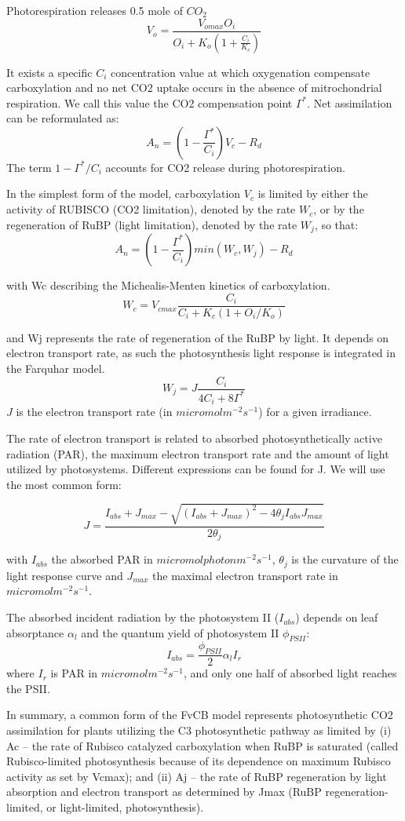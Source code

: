 \documentclass[
  12pt,
  oneside]{book}
\begin{document}
Photorespiration releases 0.5 mole of \(CO_2\)
\[
V_o=\frac{V_{omax}O_i}{O_i+K_o\left( 1+\frac{C_i}{K_c}\right)}
\]

It exists a specific \(C_i\) concentration value at which oxygenation compensate carboxylation and no net CO2 uptake occurs in the absence of mitrochondrial respiration. We call this value the CO2 compensation point \(\Gamma^*\). Net assimilation can be reformulated as:
\[
A_n=(1-\frac{\Gamma^*}{C_i})V_c-R_d
\]
The term \(1-\Gamma^*/C_i\) accounts for CO2 release during photorespiration.

In the simplest form of the model, carboxylation \(V_c\) is limited by either the activity of RUBISCO (CO2 limitation), denoted by the rate \(W_c\), or by the regeneration of RuBP (light limitation), denoted by the rate \(W_j\), so that:
\[
A_n=(1-\frac{\Gamma^*}{C_i})min(W_c,W_j)-R_d
\]

with Wc describing the Michealis-Menten kinetics of carboxylation.
\[
W_c=V_{cmax}\frac{C_i}{C_i+K_c(1+O_i/K_o)}
\]

and Wj represents the rate of regeneration of the RuBP by light. It depends on electron transport rate, as such the photosynthesis light response is integrated in the Farquhar model.\\
\[
W_j=J\frac{C_i}{4C_i+8\Gamma^*}
\]
\(J\) is the electron transport rate (in \(micromol m^{-2} s^{-1}\)) for a given irradiance.

The rate of electron transport is related to absorbed photosynthetically active radiation (PAR), the maximum electron transport rate and the amount of light utilized by photosystems. Different expressions can be found for J. We will use the most common form:

\[
J=\frac{I_{abs}+J_{max}-\sqrt{(I_{abs}+J_{max})^2-4\theta_jI_{abs}J_{max}}}{2\theta_j}
\]

with \(I_{abs}\) the absorbed PAR in \(micromol photon m^{-2} s^{-1}\), \(\theta_j\) is the curvature of the light response curve and \(J_{max}\) the maximal electron transport rate in \(micromol m^{-2} s^{-1}\).

The absorbed incident radiation by the photosystem II (\(I_{abs}\)) depends on leaf absorptance \(\alpha_l\) and the quantum yield of photosystem II \(\phi_{PSII}\):
\[
I_{abs}=\frac{\phi_{PSII}}{2}\alpha_lI_r
\]
where \(I_r\) is PAR in \(micromol m^{-2} s^{-1}\), and only one half of absorbed light reaches the PSII.

In summary, a common form of the FvCB model represents photosynthetic CO2 assimilation for plants utilizing the C3 photosynthetic pathway as limited by (i) Ac -- the rate of Rubisco catalyzed carboxylation when RuBP is saturated (called Rubisco-limited photosynthesis because of its dependence on maximum Rubisco activity as set by Vcmax); and (ii) Aj -- the rate of RuBP regeneration by light absorption and electron transport as determined by Jmax (RuBP regeneration-limited, or light-limited, photosynthesis).
\end{document}
